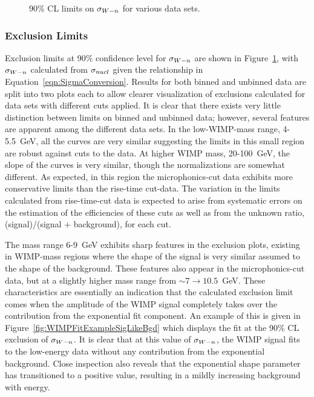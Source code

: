 			\begin{sidewaysfigure}
				\centering
				\caption[90\% CL limits on $\sigman$ for various data sets]
				{90\% CL limits on $\sigman$ for various data sets.}
				\label{fig:UnconstrainedLimits}
			\end{sidewaysfigure}			
			
			\subsubsection{Exclusion Limits}	
Exclusion limits at 90\% confidence level for $\sigman$ are shown in Figure~\ref{fig:UnconstrainedLimits}, with $\sigman$ calculated from $\sigma_{nucl}$ given the relationship in Equation~\ref{eqn:SigmaConversion}.  Results for both binned and unbinned data are split into two plots each to allow clearer visualization of exclusions calculated for data sets with different cuts applied.  
It is clear that there exists very little distinction between limits on binned and unbinned data; however, several features are apparent among the different data sets.  In the low-WIMP-mass range, 4-5.5~GeV, all the curves are very similar suggesting the limits in this small region are robust against cuts to the data.  At higher WIMP mass, 20-100~GeV, the slope of the curves is very similar, though the normalizations are somewhat different.  As expected, in this region the microphonics-cut data exhibits more conservative limits than the rise-time cut-data.  The variation in the limits calculated from rise-time-cut data is expected to arise from systematic errors on the estimation of the efficiencies of these cuts as well as from the unknown ratio, (signal)/(signal + background), for each cut.  

The mass range 6-9~GeV exhibits sharp features in the exclusion plots, existing in WIMP-mass regions where the shape of the signal is very similar assumed to the shape of the background.  These features also appear in the microphonics-cut data, but at a slightly higher mass range from $\sim7\to10.5$~GeV.  These characteristics are essentially an indication that the calculated exclusion limit comes when the amplitude of the WIMP signal completely takes over the contribution from the exponential fit component.  An example of this is given in Figure~\ref{fig:WIMPFitExampleSigLikeBgd} which displays the fit at the 90\% CL exclusion of $\sigman$.  It is clear that at this value of $\sigman$, the WIMP signal fits to the low-energy data without any contribution from the exponential background.  Close inspection also reveals that the exponential shape parameter has transitioned to a positive value, resulting in a mildly increasing background with energy.  

